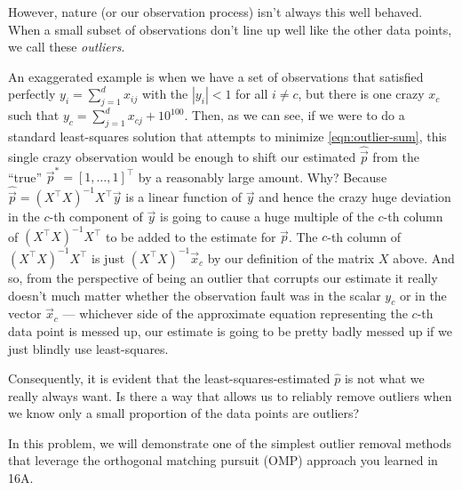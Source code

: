 However, nature (or our observation process) isn't always this well
behaved. When a small subset of observations don't line up well like
the other data points, we call these \textit{outliers}. 

An exaggerated example is when we have a set of observations that
satisfied perfectly $y_i = \sum_{j=1}^d x_{ij}$ with the $|y_i|<1$ for
all $i\neq c$, but there is one crazy $x_c$ such that
$y_c = \sum_{j=1}^d x_{cj} + 10^{100}$. Then, as we can see, if we
were to do a standard least-squares solution that attempts to minimize
\eqref{eqn:outlier-sum}, this single crazy observation would be enough
to shift our estimated $\hat{\vec{p}}$ from the ``true''
$\vec{p}^* = [1,\ldots,1]^\top$ by a reasonably large amount.  Why?
Because $\hat{\vec{p}} = (X^\top X)^{-1}X^\top \vec{y}$ is a linear function
of $\vec{y}$ and hence the crazy huge deviation in the $c$-th
component of $\vec{y}$ is going to cause a huge multiple of the $c$-th
column of $(X^\top X)^{-1}X^\top$ to be added to the estimate for
$\vec{p}$. The $c$-th column of $(X^\top X)^{-1}X^\top$ is just
$(X^\top X)^{-1}\vec{x}_c$ by our definition of the matrix $X$ above. And
so, from the perspective of being an outlier that corrupts our
estimate it really doesn't much matter whether the observation fault
was in the scalar $y_c$ or in the vector $\vec{x}_c$ --- whichever
side of the approximate equation representing the $c$-th data point is
messed up, our estimate is going to be pretty badly messed up if we
just blindly use least-squares.


Consequently, it is evident that the least-squares-estimated $\hat{p}$
is not what we really always want. Is there a way that allows us to reliably
remove outliers when we know only a small proportion of the data
points are outliers?  

In this problem, we will demonstrate one of the simplest outlier removal
methods that leverage the orthogonal matching pursuit (OMP) approach
you learned in 16A.

